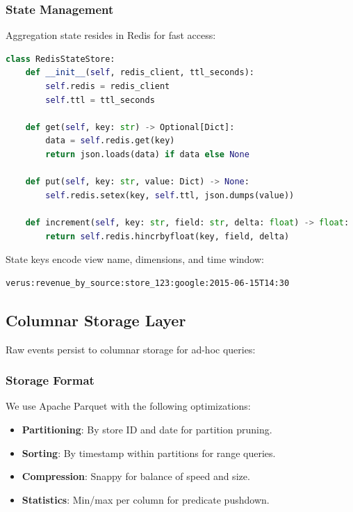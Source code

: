 \subsubsection{State Management}

Aggregation state resides in Redis for fast access:

\begin{lstlisting}[language=Python,caption=Redis state store]
class RedisStateStore:
    def __init__(self, redis_client, ttl_seconds):
        self.redis = redis_client
        self.ttl = ttl_seconds

    def get(self, key: str) -> Optional[Dict]:
        data = self.redis.get(key)
        return json.loads(data) if data else None

    def put(self, key: str, value: Dict) -> None:
        self.redis.setex(key, self.ttl, json.dumps(value))

    def increment(self, key: str, field: str, delta: float) -> float:
        return self.redis.hincrbyfloat(key, field, delta)
\end{lstlisting}

State keys encode view name, dimensions, and time window:

\begin{verbatim}
verus:revenue_by_source:store_123:google:2015-06-15T14:30
\end{verbatim}

\subsection{Columnar Storage Layer}

Raw events persist to columnar storage for ad-hoc queries:

\subsubsection{Storage Format}

We use Apache Parquet with the following optimizations:

\begin{itemize}
\item \textbf{Partitioning}: By store ID and date for partition pruning.
\item \textbf{Sorting}: By timestamp within partitions for range queries.
\item \textbf{Compression}: Snappy for balance of speed and size.
\item \textbf{Statistics}: Min/max per column for predicate pushdown.
\end{itemize}

